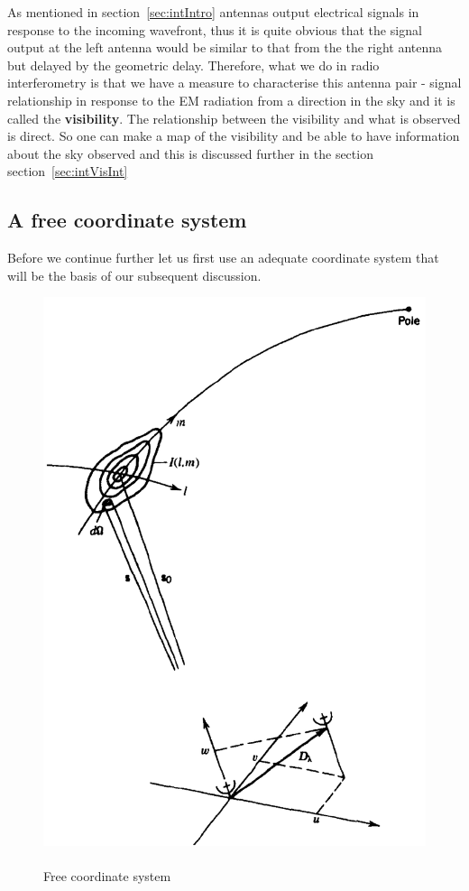 As mentioned in section~\ref{sec:intIntro} antennas output electrical signals in response to the incoming wavefront, thus it is quite obvious that the signal output at the left antenna would be similar to that from the the right antenna but delayed by the geometric delay. Therefore, what we do in radio interferometry is that we have a measure to characterise this antenna pair - signal relationship in response to the EM radiation from a direction in the sky and it is called the \textbf{visibility}.
The relationship between the visibility and what is observed is direct. So one can make a map of the visibility and be able to have information about the sky observed and this is discussed further in the section  section~\ref{sec:intVisInt}
\subsection{A free coordinate system}
\label{sec:intFreeCoor}
Before we continue further let us first use an adequate coordinate system that will be the basis of our subsequent discussion.
\begin{figure}[htbp]
\center
    \includegraphics[scale= 0.9]{Figures/freeCoor}
 	\caption[Free coordinate system]{\\Free coordinate system}
	\label{fig:freeCoor}
\end{figure}
